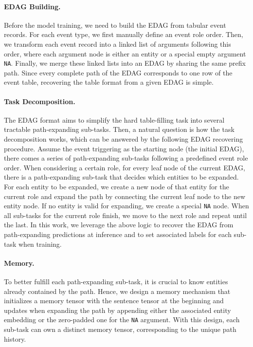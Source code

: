\documentclass[11pt,a4paper]{article}
\begin{document}
\paragraph{EDAG Building.}
Before the model training, we need to build the EDAG from tabular event records.
For each event type, we first manually define an event role order.
Then, we transform each event record into a linked list of arguments following this order, where each argument node is either an entity or a special empty argument \texttt{NA}.
Finally, we merge these linked lists into an EDAG by sharing the same prefix path.
Since every complete path of the EDAG corresponds to one row of the event table, recovering the table format from a given EDAG is simple.

\paragraph{Task Decomposition.}
The EDAG format aims to simplify the hard table-filling task into several tractable path-expanding sub-tasks.
Then, a natural question is how the task decomposition works, which can be answered by the following EDAG recovering procedure.
Assume the event triggering as the starting node (the initial EDAG), there comes a series of path-expanding sub-tasks following a predefined event role order. 
When considering a certain role, for every leaf node of the current EDAG, there is a path-expanding sub-task that decides which entities to be expanded.
For each entity to be expanded, we create a new node of that entity for the current role and expand the path by connecting the current leaf node to the new entity node.
If no entity is valid for expanding, we create a special \texttt{NA} node.
When all sub-tasks for the current role finish, we move to the next role and repeat until the last.
In this work, we leverage the above logic to recover the EDAG from path-expanding predictions at inference and to set associated labels for each sub-task when training.

\paragraph{Memory.}
To better fulfill each path-expanding sub-task, it is crucial to know entities already contained by the path.
Hence, we design a memory mechanism that initializes a memory tensor  with the sentence tensor  at the beginning and updates  when expanding the path by appending either the associated entity embedding or the zero-padded one for the \texttt{NA} argument.
With this design, each sub-task can own a distinct memory tensor, corresponding to the unique path history.
\end{document}
